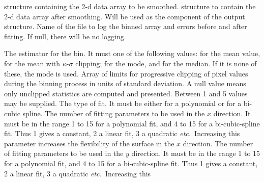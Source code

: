 {\begin{manroutinedescription}
\begin{manparametertable}
  {} structure containing the 2-d data array to be smoothed.
  {} structure to contain the 2-d data array after smoothing.
  Will be used as the {} component of the output
  {} structure. \mbox{}
  Name of the file to log the binned array and errors before
  and after fitting.  If null, there will be no logging. {\mantt{[!]}}
\end{manparametertable}
\begin{manparametertable}
  The estimator for the bin.  It must one of the following values:
  {} for the mean value, {} for the mean
  with {$\kappa$}-{$\sigma$} clipping; {} for the mode, and
  {} for the median. If it is none of these, the mode is
  used. {\mantt ['Mode']}
  Array of limits for progressive clipping of pixel values
  during the binning process in units of standard deviation.
  A null value means only unclipped statistics are computed
  and presented. Between 1 and 5 values may be supplied. {\mantt{[2,3]}}
  The type of fit.  It must be either {} for a
  polynomial or {} for a bi-cubic spline. {\mantt ['Spline']}
  The number of fitting parameters to be used in the {$x$}
  direction.  It must be in the range 1 to 15 for a polynomial
  fit, and 4 to 15 for a bi-cubic-spline fit. Thus 1 gives
  a constant, 2 a linear fit, 3 a quadratic {\it etc.}\ Increasing this
  parameter increases the flexibility of the surface in the {$x$}
  direction. {\mantt{[4]}}
  The number of fitting parameters to be used in the {$y$}
  direction.  It must be in the range 1 to 15 for a polynomial
  fit, and 4 to 15 for a bi-cubic-spline fit. Thus 1 gives
  a constant, 2 a linear fit, 3 a quadratic {\it etc.}\ Increasing this

\end{manparametertable}
\end{manroutinedescription}}
